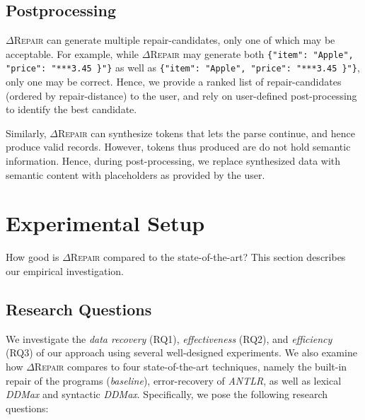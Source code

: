\documentclass[acmsmall,screen,review,anonymous]{acmart}
\newcommand{\approach}{\textsc{$\Delta$Repair}\xspace}
\newcommand{\ddmax}{\textit{DDMax}\xspace}
\newcommand{\drepair}{\approach}
\def\<#1>{\texttt{#1}}
\begin{document}
\subsection{Postprocessing}
\drepair can generate multiple repair-candidates, only one of which may be
acceptable. For example, while \drepair may generate both
\<\{"item": "Apple", "price": "***3.45 \}"\}> as well as \<\{"item": "Apple", "price": "***3.45 \}"\}>,
only one may be correct. Hence, we provide a ranked list
of repair-candidates (ordered by repair-distance) to the user, and rely on
user-defined post-processing to identify the best candidate.

Similarly,
\drepair can synthesize tokens that lets the parse continue, and hence produce
valid records. However, tokens thus produced are do not hold semantic information.
Hence, during post-processing, we replace synthesized data with semantic content
with placeholders as provided by the user.

\section{Experimental Setup}
\label{sec:experimental-setup}

How good is \drepair compared to the state-of-the-art? This section describes
our empirical investigation.

\subsection{Research Questions} 
We investigate the \textit{data recovery} (RQ1), \textit{effectiveness} (RQ2), 
and \textit{efficiency} (RQ3) of our approach using several well-designed experiments. %
We also examine how \approach compares to four state-of-the-art techniques, 
namely the built-in repair of the programs (\textit{baseline}), error-recovery of \textit{ANTLR}, as well as 
lexical \ddmax and syntactic 
\ddmax. Specifically, we pose the following research questions:
\end{document}

